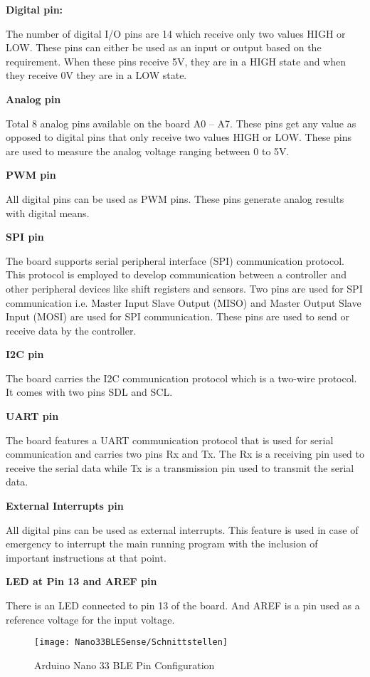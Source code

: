\textbf{Digital pin:}

The number of digital I/O pins are 14 which receive only two values HIGH or LOW. These pins can either be used as an input or output based on the requirement. When these pins receive 5V, they are in a HIGH state and when they receive 0V they are in a LOW state.

\textbf{Analog pin}

Total 8 analog pins available on the board A0 – A7. These pins get any value as opposed to digital pins that only receive two values HIGH or LOW. These pins are used to measure the analog voltage ranging between 0 to 5V.


\textbf{PWM pin}

All digital pins can be used as PWM pins. These pins generate analog results with digital means.


\textbf{SPI pin}

The board supports serial peripheral interface (SPI) communication protocol. This protocol is employed to develop communication between a controller and other peripheral devices like shift registers and sensors. Two pins are used for SPI communication i.e. Master Input Slave Output (MISO) and Master Output Slave Input (MOSI) are used for SPI communication. These pins are used to send or receive data by the controller.

\textbf{I2C pin}

The board carries the I2C communication protocol which is a two-wire protocol. It comes with two pins SDL and SCL.

\textbf{UART pin}

The board features a UART communication protocol that is used for serial communication and carries two pins Rx and Tx. The Rx is a receiving pin used to receive the serial data while Tx is a transmission pin used to transmit the serial data.


\textbf{External Interrupts pin}

All digital pins can be used as external interrupts. This feature is used in case of emergency to interrupt the main running program with the inclusion of important instructions at that point.

\textbf{LED at Pin 13 and AREF pin}

There is an LED connected to pin 13 of the board. And AREF is a pin used as a reference voltage for the input voltage.



\begin{figure}[ht]
	\centering
	\texttt{[image: Nano33BLESense/Schnittstellen]}
	\caption{Arduino Nano 33 BLE Pin Configuration}
	\label{Schnittstellen}
\end{figure}


